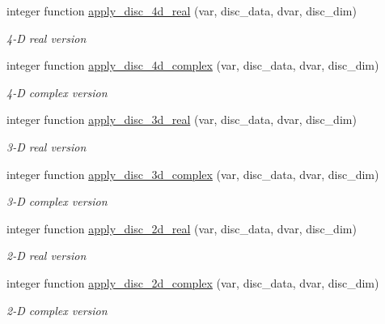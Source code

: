 \begin{DoxyCompactItemize}
\item 
integer function \hyperlink{interfacegrid__utilities_1_1apply__disc_aa6b6f7bdc47f5605513f2a7aeae455cb}{apply\+\_\+disc\+\_\+4d\+\_\+real} (var, disc\+\_\+data, dvar, disc\+\_\+dim)
\begin{DoxyCompactList}\small\item\em 4-\/D real version \end{DoxyCompactList}\item 
integer function \hyperlink{interfacegrid__utilities_1_1apply__disc_a2683d653e1630550d0c2efe28a964aee}{apply\+\_\+disc\+\_\+4d\+\_\+complex} (var, disc\+\_\+data, dvar, disc\+\_\+dim)
\begin{DoxyCompactList}\small\item\em 4-\/D complex version \end{DoxyCompactList}\item 
integer function \hyperlink{interfacegrid__utilities_1_1apply__disc_a6090e13191c08f228e9027710ba13030}{apply\+\_\+disc\+\_\+3d\+\_\+real} (var, disc\+\_\+data, dvar, disc\+\_\+dim)
\begin{DoxyCompactList}\small\item\em 3-\/D real version \end{DoxyCompactList}\item 
integer function \hyperlink{interfacegrid__utilities_1_1apply__disc_adbd3fc70f7e4197ed6b62f7f1ef59d78}{apply\+\_\+disc\+\_\+3d\+\_\+complex} (var, disc\+\_\+data, dvar, disc\+\_\+dim)
\begin{DoxyCompactList}\small\item\em 3-\/D complex version \end{DoxyCompactList}\item 
integer function \hyperlink{interfacegrid__utilities_1_1apply__disc_a5c67bc6348c3763c23a0c2fa0649a1a5}{apply\+\_\+disc\+\_\+2d\+\_\+real} (var, disc\+\_\+data, dvar, disc\+\_\+dim)
\begin{DoxyCompactList}\small\item\em 2-\/D real version \end{DoxyCompactList}\item 
integer function \hyperlink{interfacegrid__utilities_1_1apply__disc_a357bfd8308ac3460c913732d1a3850d0}{apply\+\_\+disc\+\_\+2d\+\_\+complex} (var, disc\+\_\+data, dvar, disc\+\_\+dim)
\begin{DoxyCompactList}\small\item\em 2-\/D complex version \end{DoxyCompactList}\item 

\end{DoxyCompactItemize}
